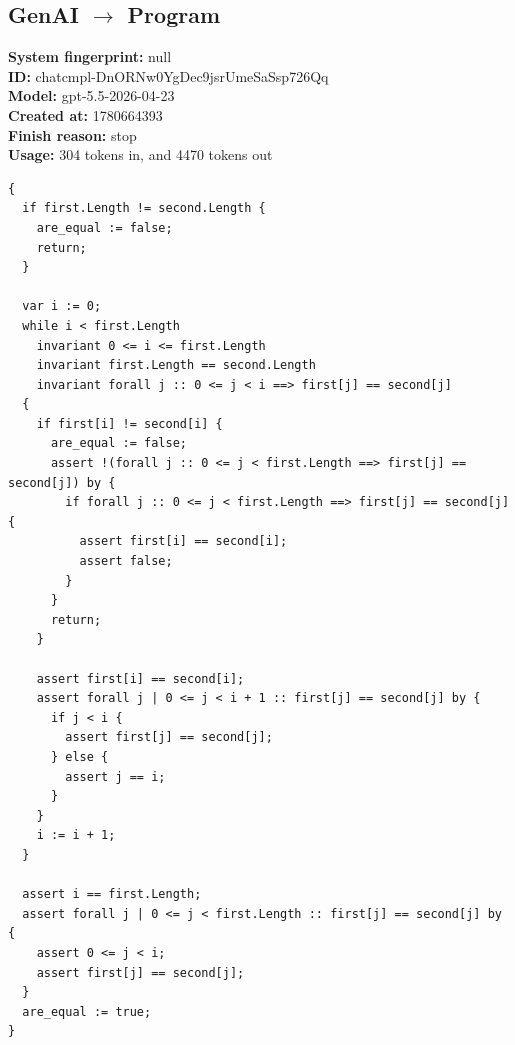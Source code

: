 \documentclass{article}
\begin{document}
\subsection*{GenAI $\rightarrow$ Program}
\textbf{System fingerprint: }null
\\\textbf{ID: }chatcmpl-DnORNw0YgDec9jsrUmeSaSsp726Qq
\\\textbf{Model: }gpt-5.5-2026-04-23
\\\textbf{Created at: }1780664393
\\\textbf{Finish reason: }stop
\\\textbf{Usage: }304 tokens in, and 4470 tokens out
\begin{lstlisting}
{
  if first.Length != second.Length {
    are_equal := false;
    return;
  }

  var i := 0;
  while i < first.Length
    invariant 0 <= i <= first.Length
    invariant first.Length == second.Length
    invariant forall j :: 0 <= j < i ==> first[j] == second[j]
  {
    if first[i] != second[i] {
      are_equal := false;
      assert !(forall j :: 0 <= j < first.Length ==> first[j] == second[j]) by {
        if forall j :: 0 <= j < first.Length ==> first[j] == second[j] {
          assert first[i] == second[i];
          assert false;
        }
      }
      return;
    }

    assert first[i] == second[i];
    assert forall j | 0 <= j < i + 1 :: first[j] == second[j] by {
      if j < i {
        assert first[j] == second[j];
      } else {
        assert j == i;
      }
    }
    i := i + 1;
  }

  assert i == first.Length;
  assert forall j | 0 <= j < first.Length :: first[j] == second[j] by {
    assert 0 <= j < i;
    assert first[j] == second[j];
  }
  are_equal := true;
}
\end{lstlisting}
\end{document}
